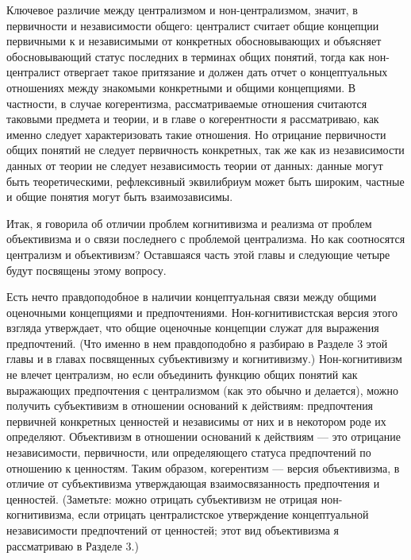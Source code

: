 \documentclass[11pt]{book}
\begin{document}
Ключевое различие между централизмом и нон-централизмом, значит, в первичности и независимости общего: централист считает общие концепции первичными к и независимыми от конкретных обосновывающих и объясняет обосновывающий статус последних в терминах общих понятий, тогда как нон-централист отвергает такое притязание и должен дать отчет о концептуальных отношениях между знакомыми конкретными и общими концепциями. В частности, в случае когерентизма, рассматриваемые отношения считаются таковыми предмета и теории, и в главе о когерентности я рассматриваю, как именно следует характеризовать такие отношения. Но отрицание первичности общих понятий не следует первичность конкретных, так же как из независимости данных от теории не следует независимость теории от данных: данные могут быть теоретическими, рефлексивный эквилибриум может быть широким, частные и общие понятия могут быть взаимозависимы.

Итак, я говорила об отличии проблем когнитивизма и реализма от проблем объективизма и о связи последнего с проблемой централизма. Но как соотносятся централизм и объективизм? Оставшаяся часть этой главы и следующие четыре будут посвящены этому вопросу.

Есть нечто правдоподобное в наличии концептуальная связи между общими оценочными концепциями и предпочтениями. Нон-когнитивистская версия этого взгляда утверждает, что общие оценочные концепции служат для выражения предпочтений. (Что именно в нем правдоподобно я разбираю в Разделе 3 этой главы и в главах посвященных субъективизму и когнитивизму.) Нон-когнитивизм не влечет централизм, но если объединить функцию общих понятий как выражающих предпочтения с централизмом (как это обычно и делается), можно получить субъективизм в отношении оснований к действиям: предпочтения первичней конкретных ценностей и независимы от них и в некотором роде их определяют. Объективизм в отношении оснований к действиям --- это отрицание независимости, первичности, или определяющего статуса предпочтений по отношению к ценностям. Таким образом, когерентизм --- версия объективизма, в отличие от субъективизма утверждающая взаимосвязанность предпочтения и ценностей. (Заметьте: можно отрицать субъективизм не отрицая нон-когнитивизма, если отрицать централистское утверждение концептуальной независимости предпочтений от ценностей; этот вид объективизма я рассматриваю в Разделе 3.)
\end{document}
